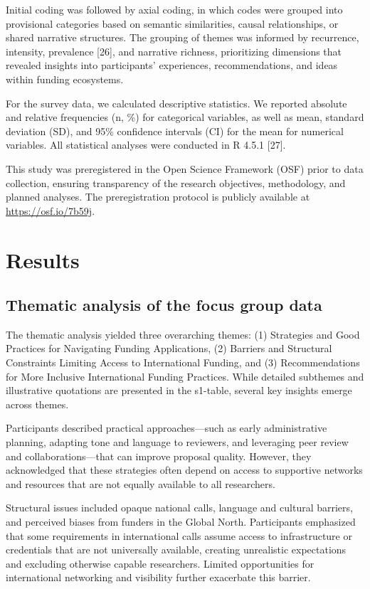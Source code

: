 \documentclass[
  letterpaper,
  DIV=11,
  numbers=noendperiod]{scrartcl}
\begin{document}
Initial coding was followed by axial coding, in which codes were grouped
into provisional categories based on semantic similarities, causal
relationships, or shared narrative structures. The grouping of themes
was informed by recurrence, intensity, prevalence {[}26{]}, and
narrative richness, prioritizing dimensions that revealed insights into
participants' experiences, recommendations, and ideas within funding
ecosystems.

For the survey data, we calculated descriptive statistics. We reported
absolute and relative frequencies (n, \%) for categorical variables, as
well as mean, standard deviation (SD), and 95\% confidence intervals
(CI) for the mean for numerical variables. All statistical analyses were
conducted in R 4.5.1 {[}27{]}.

This study was preregistered in the Open Science Framework (OSF) prior
to data collection, ensuring transparency of the research objectives,
methodology, and planned analyses. The preregistration protocol is
publicly available at \url{https://osf.io/7b59j}.

\section{Results}\label{results}

\subsection{Thematic analysis of the focus group
data}\label{thematic-analysis-of-the-focus-group-data}

The thematic analysis yielded three overarching themes: (1) Strategies
and Good Practices for Navigating Funding Applications, (2) Barriers and
Structural Constraints Limiting Access to International Funding, and (3)
Recommendations for More Inclusive International Funding Practices.
While detailed subthemes and illustrative quotations are presented in
the {s1-table}, several key insights emerge across themes.

Participants described practical approaches---such as early
administrative planning, adapting tone and language to reviewers, and
leveraging peer review and collaborations---that can improve proposal
quality. However, they acknowledged that these strategies often depend
on access to supportive networks and resources that are not equally
available to all researchers.

Structural issues included opaque national calls, language and cultural
barriers, and perceived biases from funders in the Global North.
Participants emphasized that some requirements in international calls
assume access to infrastructure or credentials that are not universally
available, creating unrealistic expectations and excluding otherwise
capable researchers. Limited opportunities for international networking
and visibility further exacerbate this barrier.
\end{document}
